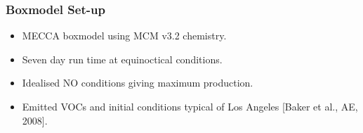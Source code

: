 %
\begin{frame}
    \frametitle{Boxmodel Set-up}
    \vspace{-4mm}

    \begin{itemize}
        \item MECCA boxmodel using MCM v3.2 chemistry. \vspace{3mm}
        \item Seven day run time at equinoctical conditions. \vspace{3mm}
        \item Idealised NO conditions giving maximum  production. \vspace{3mm}
        \item Emitted VOCs and initial conditions typical of Los Angeles [Baker et al., AE, 2008].
    \end{itemize}
\end{frame}
